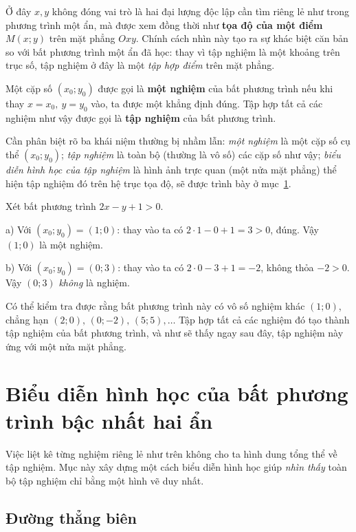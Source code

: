 \documentclass[12pt,a4paper]{report}
\begin{document}
Ở đây $x,y$ không đóng vai trò là hai đại lượng độc lập cần tìm riêng lẻ như trong phương trình một ẩn, mà được xem đồng thời như \textbf{tọa độ của một điểm} $M(x;y)$ trên mặt phẳng $Oxy$. Chính cách nhìn này tạo ra sự khác biệt căn bản so với bất phương trình một ẩn đã học: thay vì tập nghiệm là một khoảng trên trục số, tập nghiệm ở đây là một \emph{tập hợp điểm} trên mặt phẳng.

Một cặp số $(x_0;y_0)$ được gọi là \textbf{một nghiệm} của bất phương trình nếu khi thay $x=x_0,\ y=y_0$ vào, ta được một khẳng định đúng. Tập hợp tất cả các nghiệm như vậy được gọi là \textbf{tập nghiệm} của bất phương trình.

\begin{notebox}
Cần phân biệt rõ ba khái niệm thường bị nhầm lẫn: \textit{một nghiệm} là một cặp số cụ thể $(x_0;y_0)$; \textit{tập nghiệm} là toàn bộ (thường là vô số) các cặp số như vậy; \textit{biểu diễn hình học của tập nghiệm} là hình ảnh trực quan (một nửa mặt phẳng) thể hiện tập nghiệm đó trên hệ trục tọa độ, sẽ được trình bày ở mục~\ref{sec:1.2}.
\end{notebox}

\begin{examplebox}
Xét bất phương trình $2x-y+1>0$.

a) Với $(x_0;y_0)=(1;0)$: thay vào ta có $2\cdot 1-0+1=3>0$, đúng. Vậy $(1;0)$ là một nghiệm.

b) Với $(x_0;y_0)=(0;3)$: thay vào ta có $2\cdot 0-3+1=-2$, không thỏa $-2>0$. Vậy $(0;3)$ \emph{không} là nghiệm.

Có thể kiểm tra được rằng bất phương trình này có vô số nghiệm khác $(1;0)$, chẳng hạn $(2;0),\,(0;-2),\,(5;5),\dots$ Tập hợp tất cả các nghiệm đó tạo thành tập nghiệm của bất phương trình, và như sẽ thấy ngay sau đây, tập nghiệm này ứng với một nửa mặt phẳng.
\end{examplebox}

\section{Biểu diễn hình học của bất phương trình bậc nhất hai ẩn}
\label{sec:1.2}

Việc liệt kê từng nghiệm riêng lẻ như trên không cho ta hình dung tổng thể về tập nghiệm. Mục này xây dựng một cách biểu diễn hình học giúp \emph{nhìn thấy} toàn bộ tập nghiệm chỉ bằng một hình vẽ duy nhất.

\subsection{Đường thẳng biên}
\end{document}
